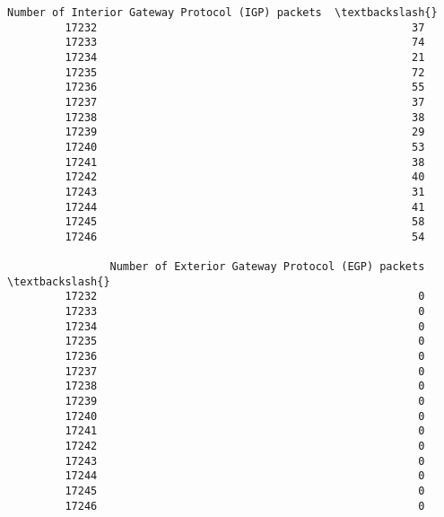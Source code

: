 \documentclass[11pt]{article}
\begin{document}
\begin{Verbatim}[commandchars=\\\{\}]
                Number of Interior Gateway Protocol (IGP) packets  \textbackslash{}
         17232                                                 37   
         17233                                                 74   
         17234                                                 21   
         17235                                                 72   
         17236                                                 55   
         17237                                                 37   
         17238                                                 38   
         17239                                                 29   
         17240                                                 53   
         17241                                                 38   
         17242                                                 40   
         17243                                                 31   
         17244                                                 41   
         17245                                                 58   
         17246                                                 54   
         
                Number of Exterior Gateway Protocol (EGP) packets  \textbackslash{}
         17232                                                  0   
         17233                                                  0   
         17234                                                  0   
         17235                                                  0   
         17236                                                  0   
         17237                                                  0   
         17238                                                  0   
         17239                                                  0   
         17240                                                  0   
         17241                                                  0   
         17242                                                  0   
         17243                                                  0   
         17244                                                  0   
         17245                                                  0   
         17246                                                  0   
         

\end{Verbatim}
\end{document}
